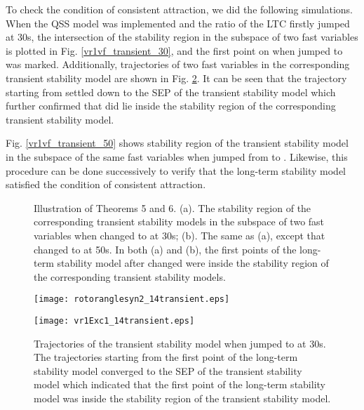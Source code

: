 \documentclass[journal]{IEEEtran}
\begin{document}
To check the condition of consistent attraction, we did the following simulations. When the QSS model was implemented and the ratio of the LTC firstly jumped at 30s, the intersection of the stability region in the subspace of two fast variables is plotted in Fig. \ref{vr1vf_transient_30}, and the first point  on  when  jumped to  was marked. Additionally, trajectories of two fast variables in the corresponding transient stability model are shown in Fig. \ref{my14transient0.959}. It can be seen that the trajectory starting from  settled down to the SEP of the transient stability model which further confirmed that  did lie inside the stability region  of the corresponding transient stability model.

Fig. \ref{vr1vf_transient_50} shows stability region of the transient stability model in the subspace of the same fast variables when  jumped from  to . Likewise, this procedure can be done successively to verify that the long-term stability model satisfied the condition of consistent attraction.

\begin{figure}
\centering
{}
\caption{Illustration of Theorems 5 and 6. (a). The stability region of the corresponding transient stability models in the subspace of two fast variables when  changed to  at 30s; (b). The same as (a), except that  changed to  at 50s. In both (a) and (b), the first points of the long-term stability model after  changed were inside the stability region of the corresponding transient stability models.}
\label{my14_SR}
\end{figure}


\begin{figure}[!ht]
\begin{minipage}[t]{0.5\linewidth}
\texttt{[image: rotoranglesyn2\_14transient.eps]}
\end{minipage}\begin{minipage}[t]{0.5\linewidth}
\texttt{[image: vr1Exc1\_14transient.eps]}
\end{minipage}
\caption{Trajectories of the transient stability model when  jumped to  at 30s. The trajectories starting from the first point of the long-term stability model converged to the SEP of the transient stability model which indicated that the first point of the long-term stability model was inside the stability region of the transient stability model.}\label{my14transient0.959}
\end{figure}
\end{document}
